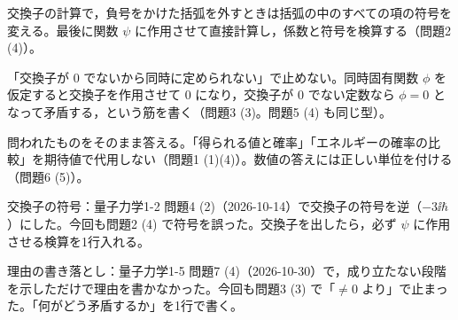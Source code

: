 \documentclass[uplatex,dvipdfmx,a4paper,11pt]{jsarticle}
\begin{document}
\matome
\begin{saitenichiran}
\end{saitenichiran}
\begin{daiji}
  \item 交換子の計算で，負号をかけた括弧を外すときは括弧の中のすべての項の符号を変える。最後に関数 $\psi$ に作用させて直接計算し，係数と符号を検算する（問題2 (4)）。
  \item 「交換子が $0$ でないから同時に定められない」で止めない。同時固有関数 $\phi$ を仮定すると交換子を作用させて $0$ になり，交換子が $0$ でない定数なら $\phi=0$ となって矛盾する，という筋を書く（問題3 (3)。問題5 (4) も同じ型）。
  \item 問われたものをそのまま答える。「得られる値と確率」「エネルギーの確率の比較」を期待値で代用しない（問題1 (1)(4)）。数値の答えには正しい単位を付ける（問題6 (5)）。
\end{daiji}
\begin{maemo}
  \item 交換子の符号：量子力学1-2 問題4 (2)（2026-10-14）で交換子の符号を逆（$-3\ii\hbar$）にした。今回も問題2 (4) で符号を誤った。交換子を出したら，必ず $\psi$ に作用させる検算を1行入れる。
  \item 理由の書き落とし：量子力学1-5 問題7 (4)（2026-10-30）で，成り立たない段階を示しただけで理由を書かなかった。今回も問題3 (3) で「$\ne 0$ より」で止まった。「何がどう矛盾するか」を1行で書く。
\end{maemo}
\end{document}
